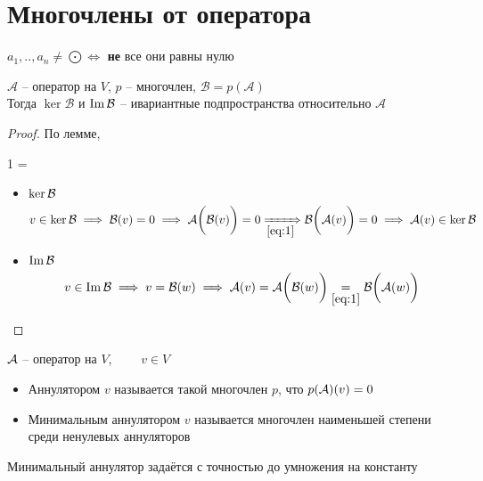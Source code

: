 \section{Многочлены от оператора}

\begin{notation}
	$ a_1, .., a_n \ne \bigodot \iff $ \textbf{не} все они равны нулю
\end{notation}

\begin{theorem}
	$ \mathcal{A} $ -- оператор на $ V $, $ p $ -- многочлен, $ \mathcal{B} = p(\mathcal{A}) $ \\
	Тогда $ \ker \mathcal{B} $ и $ \operatorname{Im} \mathcal{B} $ -- ивариантные подпространства относительно $ \mathcal{A} $
\end{theorem}

\begin{proof}
	По лемме,
	\begin{equ}1
		 \circ \mc{B} =  \circ {}
	\end{equ}
	\begin{itemize}
		\item $ \ker \mathcal{B} $
		$$ v \in \ker \mc{B} \implies \mc{B}(v) = 0 \implies \mc{A} \bigg( \mc{B}(v) \bigg) = 0 \underimp{\eref1} \mc{B} \bigg( \mc{A}(v) \bigg) = 0 \implies \mc{A}(v) \in \ker \mc{B} $$
		\item $ \operatorname{Im} \mathcal{B} $
		$$ v \in \Img \mc{B} \implies v = \mc{B}(w) \implies \mc{A}(v) = \mc{A} \bigg( \mc{B}(w) \bigg) \underset{\eref1}= \mc{B} \bigg( \mc{A}(w) \bigg) $$
	\end{itemize}
\end{proof}

\begin{definition}
	$ \mathcal{A} $ -- оператор на $ V $, $ \qquad v \in V $
	\begin{itemize}
		\item Аннулятором $ v $ называется такой многочлен $ p $, что $ p(\mathcal{A})(v) = 0 $
		\item Минимальным аннулятором $ v $ называется многочлен наименьшей степени среди ненулевых аннуляторов
	\end{itemize}
\end{definition}

\begin{remark}
	Минимальный аннулятор задаётся с точностью до умножения на константу
\end{remark}

